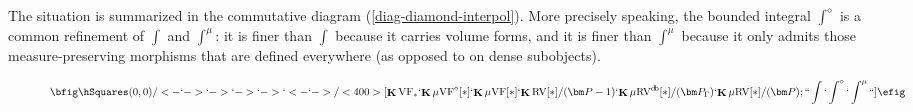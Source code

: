 \documentclass[12pt]{amsart}
\theoremstyle{plain}
\theoremstyle{definition}
\theoremstyle{remark}
\numberwithin{equation}{section}
\theoremstyle{plain}
\newcommand{\VF}{\textup{VF}}
\newcommand{\RV}{\textup{RV}}
\DeclareMathOperator{\id}{id}
\newcommand{\A}{\mathds{A}}
\newcommand{\C}{\mathds{C}}
\newcommand{\0}{\emptyset}
\newcommand{\bb}[1]{\mathbb{#1}}
\newcommand{\mgVF}{{\mu} {\VF}}
\newcommand{\mgRV}{{\mu}{\RV}}
\newcommand{\RES}{\textup{RES}}
\newcommand{\mgRES}{{\mu}{\RES}}
\newcommand{\mgE}{{\mu}{\bb E}}
\DeclareMathOperator{\ggk}{\mathbf{K}}
\DeclareMathOperator{\sggk}{!\mathbf{K}}
\DeclareMathOperator{\db}{d \! b}
\newcommand{\var}{\textup{Var}}
\begin{document}
The situation is summarized in the  commutative diagram (\ref{diag-diamond-interpol}). More precisely speaking, the bounded integral $\int^\diamond$ is a common refinement of $\int$ and $\int^\mu$: it is finer than $\int$ because it carries volume forms, and it is finer than $\int^\mu$ because it only admits those measure-preserving morphisms that are defined everywhere (as opposed to on dense subobjects).
\begin{figure}[htb]
\begin{equation}\label{diag-diamond-interpol}
\bfig
  \hSquares(0,0)/<-`->`->`->`->`<-`->/<400>[{\ggk \VF_*}`{\ggk \mgVF^\diamond[*]}`{\ggk \mgVF[*]}`{\ggk \RV[*] / (\bm P - 1)}`{\ggk \mgRV^{\db}[*] / (\bm P_\Gamma)}`{\ggk \mgRV[*] / (\bm P)}; ``\int`\int^{\diamond}`\int^\mu``]
\efig
\end{equation}
\end{figure}




%
%
\end{document}
